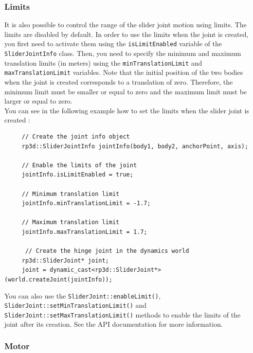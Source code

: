 \documentclass[a4paper,12pt]{article}
\begin{document}
    \subsubsection{Limits}

    It is also possible to control the range of the slider joint motion using limits. The limits are disabled by default. In order to use the limits when the joint is created, you first
    need to activate them using the \texttt{isLimitEnabled} variable of the \texttt{SliderJointInfo} class. Then, you need to specify the minimum and maximum translation limits
    (in meters) using the \texttt{minTranslationLimit} and \texttt{maxTranslation\-Limit} variables. Note that the initial position of the two bodies when the joint is created
    corresponds to a translation of zero. Therefore, the minimum limit must be smaller or equal to zero and the maximum limit must be larger or equal to zero. \\

    You can see in the following example how to set the limits when the slider joint is created : \\

    \begin{lstlisting}
     // Create the joint info object
     rp3d::SliderJointInfo jointInfo(body1, body2, anchorPoint, axis);

     // Enable the limits of the joint
     jointInfo.isLimitEnabled = true;

     // Minimum translation limit
     jointInfo.minTranslationLimit = -1.7;

     // Maximum translation limit
     jointInfo.maxTranslationLimit = 1.7;

      // Create the hinge joint in the dynamics world
     rp3d::SliderJoint* joint;
     joint = dynamic_cast<rp3d::SliderJoint*>(world.createJoint(jointInfo));
  \end{lstlisting}

    \vspace{0.6cm}
 
   \begin{sloppypar}
    You can also use the \texttt{SliderJoint::enableLimit()}, \texttt{SliderJoint::\-setMinTranslationLimit()} and \texttt{SliderJoint::setMaxTranslationLimit()} methods to enable the
    limits of the joint after its creation. See the API documentation for more information.
    \end{sloppypar}

    \subsubsection{Motor}
\end{document}
